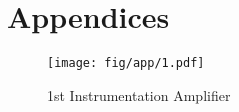
\chapter{Appendices}
\label{ch:app}

\label{Appendix A} %


\begin{figure}[h]
	\begin{center}
	\texttt{[image: fig/app/1.pdf]}
	\end{center}
	\vspace{-4mm}
	\caption[1st Instrumentation Amplifier]
	{1st Instrumentation Amplifier}
	\label{fig:app1}
	\vspace{-2mm}
\end{figure}

